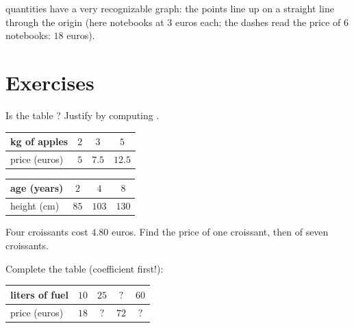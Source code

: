 \begin{omfigure}

{\small {} quantities have a very recognizable graph: the
points line up on a straight line through the origin (here notebooks at
$3$ euros each; the dashes read the price of $6$ notebooks: $18$
euros).}
\end{omfigure}

\section{Exercises}

\begin{exercise}[$\star$]\label{exo:g6:propdata:1}
Is the table ? Justify by computing .
\begin{center}
\renewcommand{\arraystretch}{1.2}
\begin{tabular}{l|ccc}
kg of apples & $2$ & $3$ & $5$ \\
\hline
price (euros) & $5$ & $7.5$ & $12.5$ \\
\end{tabular}
\qquad
\begin{tabular}{l|ccc}
age (years) & $2$ & $4$ & $8$ \\
\hline
height (cm) & $85$ & $103$ & $130$ \\
\end{tabular}
\end{center}
\end{exercise}

\begin{exercise}[$\star$]\label{exo:g6:propdata:2}
Four croissants cost $4.80$ euros. Find the price of one croissant,
then of seven croissants.
\end{exercise}

\begin{exercise}[$\star$]\label{exo:g6:propdata:3}
Complete the  table (coefficient first!):
\begin{center}
\renewcommand{\arraystretch}{1.2}
\begin{tabular}{l|cccc}
liters of fuel & $10$ & $25$ & $?$ & $60$ \\
\hline
price (euros) & $18$ & $?$ & $72$ & $?$ \\
\end{tabular}
\end{center}
\end{exercise}

